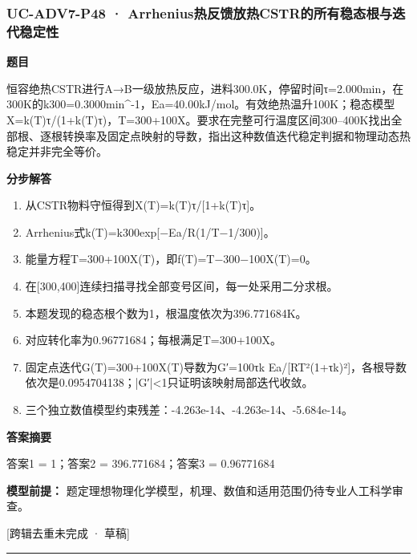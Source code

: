\documentclass[UTF8,11pt,a4paper]{ctexart}
\begin{document}
\subsubsection*{UC-ADV7-P48 · Arrhenius热反馈放热CSTR的所有稳态根与迭代稳定性}
\noindent\textbf{题目}\par
恒容绝热CSTR进行A→B一级放热反应，进料300.0K，停留时间τ=2.000min，在300K的k300=0.3000min\textasciicircum{}-1，Ea=40.00kJ/mol。有效绝热温升100K；稳态模型X=k(T)τ/(1+k(T)τ)，T=300+100X。要求在完整可行温度区间300–400K找出全部根、逐根转换率及固定点映射的导数，指出这种数值迭代稳定判据和物理动态热稳定并非完全等价。\par
\medskip\noindent\textbf{分步解答}
\begin{enumerate}
\item 从CSTR物料守恒得到X(T)=k(T)τ/[1+k(T)τ]。
\item Arrhenius式k(T)=k300exp[−Ea/R(1/T−1/300)]。
\item 能量方程T=300+100X(T)，即f(T)=T−300−100X(T)=0。
\item 在[300,400]连续扫描寻找全部变号区间，每一处采用二分求根。
\item 本题发现的稳态根个数为1，根温度依次为396.771684K。
\item 对应转化率为0.96771684；每根满足T=300+100X。
\item 固定点迭代G(T)=300+100X(T)导数为G′=100τk Ea/[RT²(1+τk)²]，各根导数依次是0.0954704138；|G′|<1只证明该映射局部迭代收敛。
\item 三个独立数值模型约束残差：-4.263e-14、-4.263e-14、-5.684e-14。
\end{enumerate}
\noindent\textbf{答案摘要}\par
答案1 = 1；答案2 = 396.771684；答案3 = 0.96771684\par
\noindent\textbf{模型前提：}
题定理想物理化学模型，机理、数值和适用范围仍待专业人工科学审查。\par
\noindent\textcolor{red!65!black}{[跨辑去重未完成 · 草稿]} \par
\medskip\hrule\medskip
{}
\end{document}
